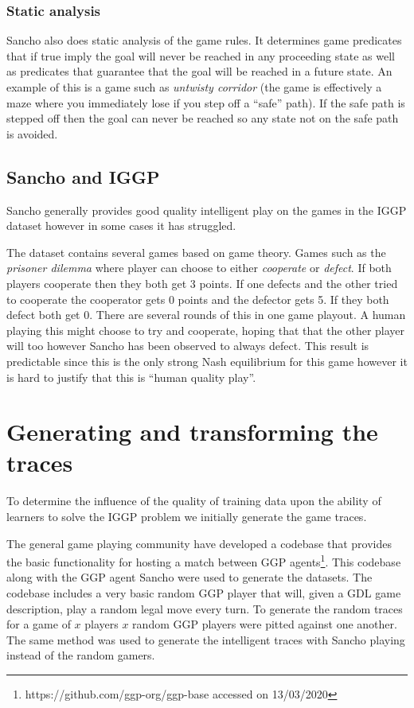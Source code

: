 \subsubsection{Static analysis}

Sancho also does static analysis of the game rules. It determines game predicates that if true imply the goal will never be reached in any proceeding state as well as predicates that guarantee that the goal will be reached in a future state. An example of this is a game such as \textit{untwisty corridor} (the game is effectively a maze where you immediately lose if you step off a ``safe'' path). If the safe path is stepped off then the goal can never be reached so any state not on the safe path is avoided.

\subsection{Sancho and IGGP}
Sancho generally provides good quality intelligent play on the games in the IGGP dataset however in some cases it has struggled.

The dataset contains several games based on game theory. Games such as the \textit{prisoner dilemma} where player can choose to either \textit{cooperate} or \textit{defect}. If both players cooperate then they both get 3 points. If one defects and the other tried to cooperate the cooperator gets 0 points and the defector gets 5. If they both defect both get 0. There are several rounds of this in one game playout. A human playing this might choose to try and cooperate, hoping that that the other player will too however Sancho has been observed to always defect. This result is predictable since this is the only strong Nash equilibrium for this game however it is hard to justify that this is ``human quality play''.


\section{Generating and transforming the traces}\label{sec:gen}
To determine the influence of the quality of training data upon the ability of learners to solve the IGGP problem we initially generate the game traces.

The general game playing community have developed a codebase that provides the basic functionality for hosting a match between GGP agents\footnote{https://github.com/ggp-org/ggp-base accessed on 13/03/2020}. This codebase along with the GGP agent Sancho were used to generate the datasets. The codebase includes a very basic random GGP player that will, given a GDL game description, play a random legal move every turn. To generate the random traces for a game of $x$ players $x$ random GGP players were pitted against one another. The same method was used to generate the intelligent traces with Sancho playing instead of the random gamers.

